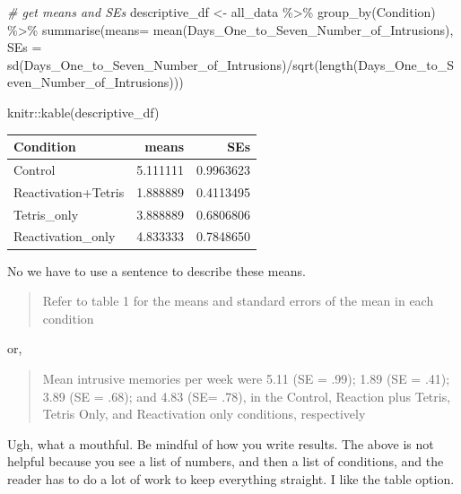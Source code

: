 \documentclass[
]{book}
\newenvironment{Shaded}{\begin{snugshade}}{\end{snugshade}}
\newcommand{\AttributeTok}[1]{\textcolor[rgb]{0.77,0.63,0.00}{#1}}
\newcommand{\CommentTok}[1]{\textcolor[rgb]{0.56,0.35,0.01}{\textit{#1}}}
\newcommand{\FunctionTok}[1]{\textcolor[rgb]{0.00,0.00,0.00}{#1}}
\newcommand{\NormalTok}[1]{#1}
\newcommand{\OtherTok}[1]{\textcolor[rgb]{0.56,0.35,0.01}{#1}}
\newcommand{\SpecialCharTok}[1]{\textcolor[rgb]{0.00,0.00,0.00}{#1}}
\begin{document}
\begin{Shaded}
\begin{Highlighting}[]
\CommentTok{\# get means and SEs}
\NormalTok{descriptive\_df }\OtherTok{\textless{}{-}}\NormalTok{ all\_data }\SpecialCharTok{\%\textgreater{}\%} 
                    \FunctionTok{group\_by}\NormalTok{(Condition) }\SpecialCharTok{\%\textgreater{}\%} 
                    \FunctionTok{summarise}\NormalTok{(}\AttributeTok{means=} \FunctionTok{mean}\NormalTok{(Days\_One\_to\_Seven\_Number\_of\_Intrusions),}
                              \AttributeTok{SEs =} \FunctionTok{sd}\NormalTok{(Days\_One\_to\_Seven\_Number\_of\_Intrusions)}\SpecialCharTok{/}\FunctionTok{sqrt}\NormalTok{(}\FunctionTok{length}\NormalTok{(Days\_One\_to\_Seven\_Number\_of\_Intrusions)))}

\NormalTok{knitr}\SpecialCharTok{::}\FunctionTok{kable}\NormalTok{(descriptive\_df)}
\end{Highlighting}
\end{Shaded}

\begin{tabular}{l|r|r}
\hline
Condition & means & SEs\\
\hline
Control & 5.111111 & 0.9963623\\
\hline
Reactivation+Tetris & 1.888889 & 0.4113495\\
\hline
Tetris\_only & 3.888889 & 0.6806806\\
\hline
Reactivation\_only & 4.833333 & 0.7848650\\
\hline
\end{tabular}

No we have to use a sentence to describe these means.

\begin{quote}
Refer to table 1 for the means and standard errors of the mean in each condition
\end{quote}

or,

\begin{quote}
Mean intrusive memories per week were 5.11 (SE = .99); 1.89 (SE = .41); 3.89 (SE = .68); and 4.83 (SE= .78), in the Control, Reaction plus Tetris, Tetris Only, and Reactivation only conditions, respectively
\end{quote}

Ugh, what a mouthful. Be mindful of how you write results. The above is not helpful because you see a list of numbers, and then a list of conditions, and the reader has to do a lot of work to keep everything straight. I like the table option.
\end{document}
